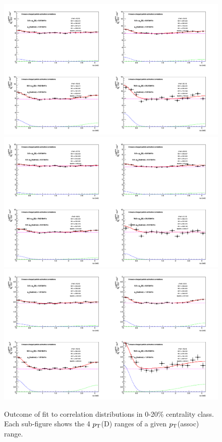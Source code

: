 \begin{figure}
\centering
{\includegraphics[width=0.8\linewidth]{figuresVsCent/Averages/020/cFitting_0_pthad03to99.png}}
{\includegraphics[width=0.8\linewidth]{figuresVsCent/Averages/020/cFitting_0_pthad03to1.png}}
{\includegraphics[width=0.8\linewidth]{figuresVsCent/Averages/020/cFitting_0_pthad1to99.png}}
 \caption{Outcome of fit to correlation distributions in 0-20\% centrality class. Each sub-figure shows the 4 $p_{\rm T}$(D) ranges of a given $p_{\rm T}$(assoc) range.}
\label{fig:fit020}
\end{figure}

